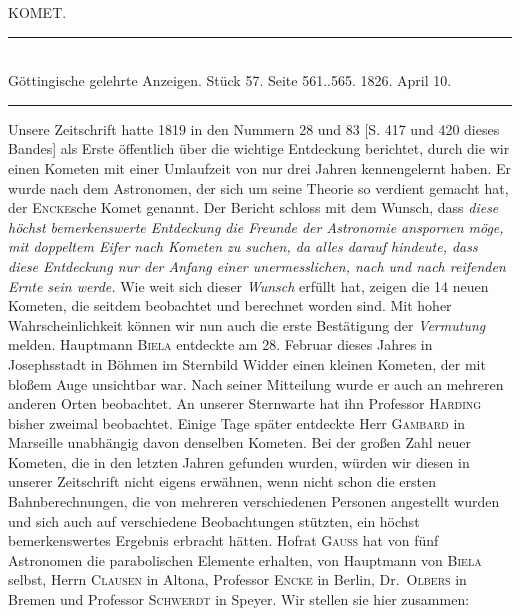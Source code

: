 \clearpage
{}
\hypertarget{native-456-comet}{}
\begin{center}
{\large KOMET.}
\end{center}

\begin{center}
\rule{6cm}{0.4pt}\\
Göttingische gelehrte Anzeigen. Stück 57. Seite 561..565. 1826. April 10.\\
\rule{6cm}{0.4pt}
\end{center}

Unsere Zeitschrift hatte 1819 in den Nummern 28 und 83 [S. 417 und 420 dieses Bandes] als Erste öffentlich über die wichtige Entdeckung berichtet, durch die wir einen Kometen mit einer Umlaufzeit von nur drei Jahren kennengelernt haben. Er wurde nach dem Astronomen, der sich um seine Theorie so verdient gemacht hat, der \textsc{Encke}sche Komet genannt. Der Bericht schloss mit dem Wunsch, dass \emph{diese höchst bemerkenswerte Entdeckung die Freunde der Astronomie anspornen möge, mit doppeltem Eifer nach Kometen zu suchen, da alles darauf hindeute, dass diese Entdeckung nur der Anfang einer unermesslichen, nach und nach reifenden Ernte sein werde.} Wie weit sich dieser \emph{Wunsch} erfüllt hat, zeigen die 14 neuen Kometen, die seitdem beobachtet und berechnet worden sind. Mit hoher Wahrscheinlichkeit können wir nun auch die erste Bestätigung der \emph{Vermutung} melden. Hauptmann \textsc{Biela} entdeckte am 28. Februar dieses Jahres in Josephsstadt in Böhmen im Sternbild Widder einen kleinen Kometen, der mit bloßem Auge unsichtbar war. Nach seiner Mitteilung wurde er auch an mehreren anderen Orten beobachtet. An unserer Sternwarte hat ihn Professor \textsc{Harding} bisher zweimal beobachtet. Einige Tage später entdeckte Herr \textsc{Gambard} in Marseille unabhängig davon denselben Kometen. Bei der großen Zahl neuer Kometen, die in den letzten Jahren gefunden wurden, würden wir diesen in unserer Zeitschrift nicht eigens erwähnen, wenn nicht schon die ersten Bahnberechnungen, die von mehreren verschiedenen Personen angestellt wurden und sich auch auf verschiedene Beobachtungen stützten, ein höchst bemerkenswertes Ergebnis erbracht hätten. Hofrat \textsc{Gauss} hat von fünf Astronomen die parabolischen Elemente erhalten, von Hauptmann von \textsc{Biela} selbst, Herrn \textsc{Clausen} in Altona, Professor \textsc{Encke} in Berlin, Dr.\ \textsc{Olbers} in Bremen und Professor \textsc{Schwerdt} in Speyer. Wir stellen sie hier zusammen:

